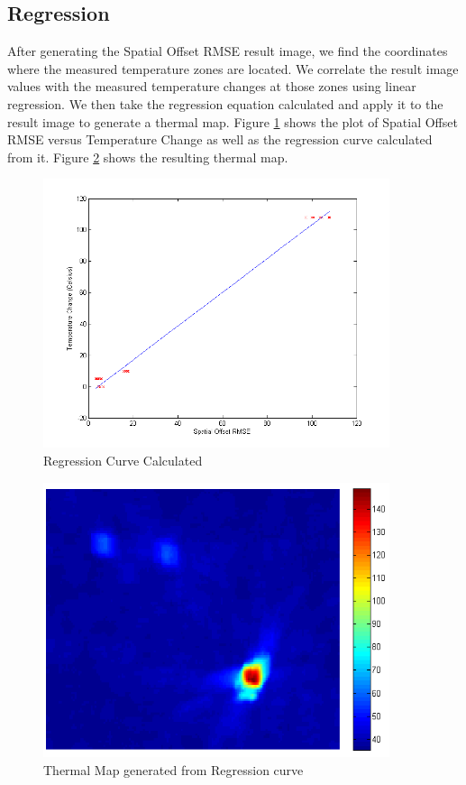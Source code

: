 \documentclass[]{spie}  %
\begin{document}
\subsection{Regression}

After generating the Spatial Offset RMSE result image, we find the coordinates where the measured temperature zones are located. We correlate the result image values with the measured temperature changes at those zones using linear regression. We then take the regression equation calculated and apply it to the result image to generate a thermal map. Figure \ref{RegressionCurve} shows the plot of Spatial Offset RMSE versus Temperature Change as well as the regression curve calculated from it. Figure \ref{ThermalMap} shows the resulting thermal map.

\begin{figure} 
\centering 
\includegraphics[width=4in]{slidingDiffRegression.png} 
\caption{Regression Curve Calculated} 
\label{RegressionCurve}
\end{figure}

\begin{figure} 
\centering 
\includegraphics[width=4in]{slidingDiffThermalMap.png} 
\caption{Thermal Map generated from Regression curve} 
\label{ThermalMap}
\end{figure}
\end{document}
